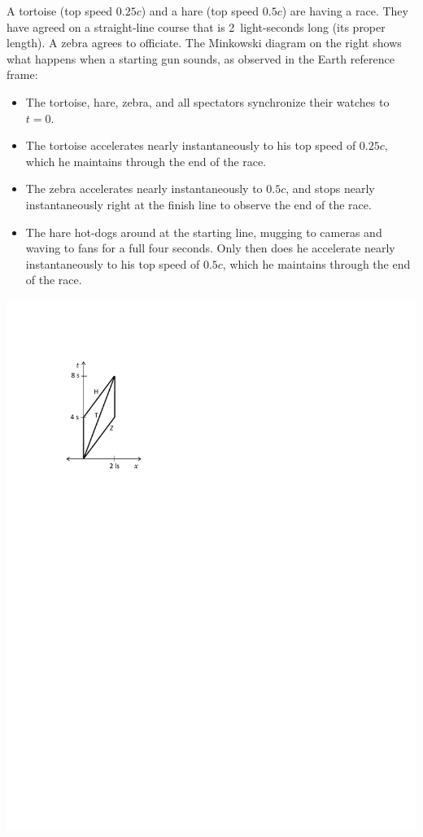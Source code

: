 \begin{Exercise}[difficulty=0]
A tortoise (top speed $0.25c$) and a hare (top speed $0.5c$) are having a race.  They have agreed on a straight-line course that is 2~light-seconds long (its proper length).  A zebra agrees to officiate.  The Minkowski diagram on the right shows what happens when a starting gun sounds, as observed in the Earth reference frame:

\begin{minipage}{0.70 \textwidth}
\begin{itemize}[nosep]
\item The tortoise, hare, zebra, and all spectators synchronize their watches to $t=0$.
\item The tortoise accelerates nearly instantaneously to his top speed of $0.25c$, which he maintains through the end of the race.  
\item The zebra accelerates nearly instantaneously to $0.5c$, and stops nearly instantaneously right at the finish line to observe the end of the race.  
\item The hare hot-dogs around at the starting line, mugging to cameras and waving to fans for a full four seconds.  Only then does he accelerate nearly instantaneously to his top speed of $0.5c$, which he maintains through the end of the race.  
\end{itemize}

\end{minipage}
\begin{minipage}{0.29 \textwidth}
\hspace{\fill}\includegraphics[scale=0.85]{M_problems/velocities_causality/tortoise_hare.pdf}


\end{minipage}
\end{Exercise}
